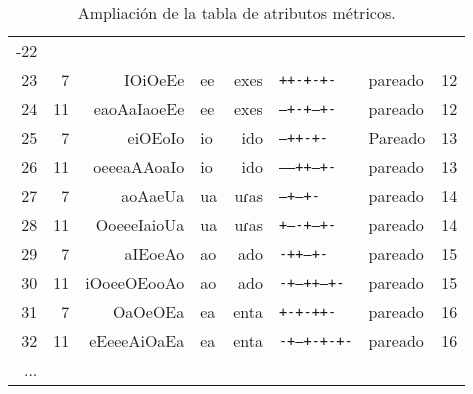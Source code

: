 \begin{table}[!ht]
\begin{tabular}{rrrlrllr}
-22&&&&&&&\\
23 & 7 &IOiOeEe & ee & exes &\texttt{++-+-+-} &pareado&12\\
24 & 11 &eaoAaIaoeEe & ee & exes &\texttt{---+-+---+-} &pareado&12\\
25 & 7 &eiOEoIo & io & ido &\texttt{--++-+-} &Pareado&13\\
26 & 11 &oeeeaAAoaIo & io & ido &\texttt{-----++--+-} &pareado&13\\
27 & 7 &aoAaeUa & ua & uɾas &\texttt{--+--+-} &pareado&14\\
28 & 11 &OoeeeIaioUa & ua & uɾas &\texttt{+----+---+-} &pareado&14\\
29 & 7 &aIEoeAo & ao & ado &\texttt{-++--+-} &pareado&15\\
30 & 11 &iOoeeOEooAo & ao & ado &\texttt{-+---++--+-} &pareado&15\\
31 & 7 &OaOeOEa & ea & enta &\texttt{+-+-++-} &pareado&16\\
32 & 11 &eEeeeAiOaEa & ea & enta &\texttt{-+---+-+-+-} &pareado&16\\
...&&&&&&&\\
\bottomrule
\end{tabular}
 \caption{Ampliación de la tabla de atributos métricos.}
        \label{tab:dramatad}
\end{table}
